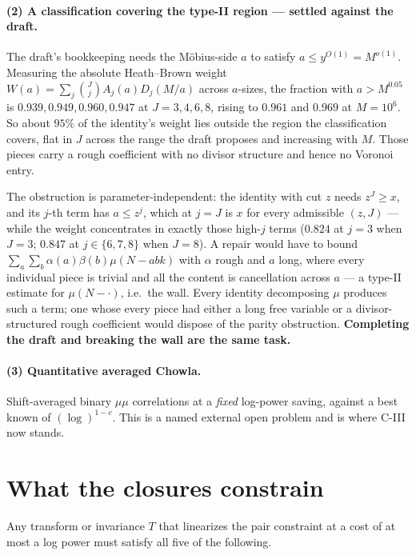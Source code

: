 \documentclass[11pt,a4paper]{article}
\theoremstyle{plain}
\theoremstyle{definition}
\begin{document}
\paragraph{(2) A classification covering the type-II region ---
settled against the draft.} The draft's bookkeeping needs the
M\"obius-side $a$ to satisfy $a \le y^{O(1)} = M^{o(1)}$. Measuring the
absolute Heath--Brown weight
$W(a) = \sum_j \binom{J}{j} A_j(a) D_j(M/a)$ across $a$-sizes, the
fraction with $a > M^{0.05}$ is $0.939, 0.949, 0.960, 0.947$ at
$J = 3, 4, 6, 8$, rising to $0.961$ and $0.969$ at $M = 10^6$. So
about $95\%$ of the identity's weight lies outside the region the
classification covers, flat in $J$ across the range the draft
proposes and increasing with $M$. Those pieces carry a rough
coefficient with no divisor structure and hence no Voronoi entry.

The obstruction is parameter-independent: the identity with cut $z$
needs $z^J \ge x$, and its $j$-th term has $a \le z^j$, which at
$j = J$ is $x$ for every admissible $(z,J)$ --- while the weight
concentrates in exactly those high-$j$ terms ($0.824$ at $j=3$ when
$J=3$; $0.847$ at $j \in \{6,7,8\}$ when $J=8$). A repair would have
to bound $\sum_a\sum_b \alpha(a)\beta(b)\mu(N-abk)$ with $\alpha$
rough and $a$ long, where every individual piece is trivial and all
the content is cancellation across $a$ --- a type-II estimate for
$\mu(N-\cdot)$, i.e.\ the wall. Every identity decomposing $\mu$
produces such a term; one whose every piece had either a long free
variable or a divisor-structured rough coefficient would dispose of
the parity obstruction. \textbf{Completing the draft and breaking the
wall are the same task.}

\paragraph{(3) Quantitative averaged Chowla.} Shift-averaged binary
$\mu\mu$ correlations at a \emph{fixed} log-power saving, against a
best known of $(\log)^{1-c}$. This is a named external open problem
and is where C-III now stands.

\section{What the closures constrain}

Any transform or invariance $T$ that linearizes the pair constraint at
a cost of at most a log power must satisfy all five of the following.
\end{document}
